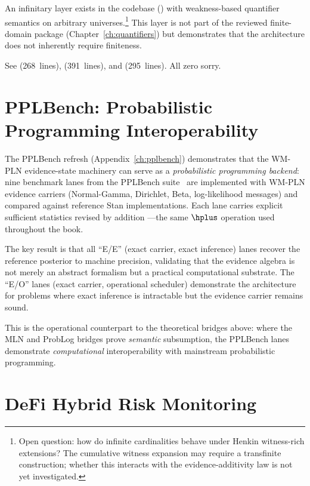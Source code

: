 \documentclass[11pt,openany]{report}
\begin{document}
An infinitary layer exists in the codebase
() with weakness-based quantifier
semantics on arbitrary universes.\footnote{Open question: how do infinite
cardinalities behave under Henkin witness-rich extensions?  The
cumulative witness expansion may require a transfinite construction;
whether this interacts with the evidence-additivity law is not yet
investigated.}  This layer is not part of the reviewed finite-domain
package (Chapter~\ref{ch:quantifiers}) but demonstrates that the
architecture does not inherently require finiteness.

\medskip
\noindent
See  (268~lines),
 (391~lines),
and 
(295~lines).  All zero sorry.


\section{PPLBench: Probabilistic Programming Interoperability}
\label{sec:pplbench-bridge}

The PPLBench refresh (Appendix~\ref{ch:pplbench}) demonstrates that the
WM-PLN evidence-state machinery can serve as a \emph{probabilistic
programming backend}: nine benchmark lanes from the PPLBench
suite~\cite{Kulkarni2020PPLBench} are implemented with WM-PLN
evidence carriers (Normal-Gamma, Dirichlet, Beta, log-likelihood
messages) and compared against reference Stan implementations.
Each lane carries explicit sufficient statistics revised by addition
---the same $\hplus$ operation used throughout the book.

The key result is that all ``E/E'' (exact carrier, exact inference)
lanes recover the reference posterior to machine precision, validating
that the evidence algebra is not merely an abstract formalism but a
practical computational substrate.  The ``E/O'' lanes (exact carrier,
operational scheduler) demonstrate the architecture for problems where
exact inference is intractable but the evidence carrier remains sound.

This is the operational counterpart to the theoretical bridges above:
where the MLN and ProbLog bridges prove \emph{semantic} subsumption,
the PPLBench lanes demonstrate \emph{computational} interoperability
with mainstream probabilistic programming.


\section{DeFi Hybrid Risk Monitoring}
\end{document}
